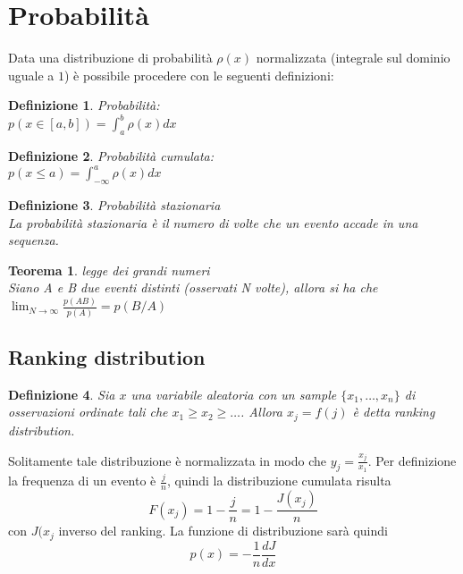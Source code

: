\documentclass[12pt, a4paper]{book}
\theoremstyle{theorem}
\newtheorem{definition}{Definizione}[section]
\newtheorem{theorem}{Teorema}[section]
\begin{document}
		\section{Probabilità}
			Data una distribuzione di probabilità $\rho(x)$ normalizzata (integrale sul dominio uguale a $1$) è possibile procedere con le seguenti definizioni:
			\begin{definition} Probabilità:\\
				$p(x\in[a,b])=\int_{a}^{b}\rho(x)dx$
			\end{definition}
			\begin{definition} Probabilità cumulata:\\
				$p(x\leq a)=\int_{-\infty}^{a}\rho(x)dx$
			\end{definition}
			\begin{definition}
				Probabilità stazionaria\\
				La probabilità stazionaria è il numero di volte che un evento accade in una sequenza.
			\end{definition}
			\begin{theorem}
				legge dei grandi numeri\\
				Siano A e B due eventi distinti (osservati N volte), allora si ha che\\
				$\lim_{N\to\infty}\frac{p(AB)}{p(A)}=p(B/A)$
			\end{theorem}
			\subsection{Ranking distribution}
				\begin{definition}
					Sia $x$ una variabile aleatoria con un sample $\{x_{1},\ldots,x_{n}\}$ di osservazioni ordinate tali che $x_{1}\geq x_{2}\geq\ldots$.
					Allora $x_{j}=f(j)$ è detta ranking distribution.
				\end{definition}
				Solitamente tale distribuzione è normalizzata in modo che $y_{j}=\frac{x_{j}}{x_{1}}$.
				Per definizione la frequenza di un evento è $\frac{j}{n}$, quindi la distribuzione cumulata risulta
				\begin{equation}
					F(x_{j})=1-\frac{j}{n}=1-\frac{J(x_{j})}{n}
				\end{equation}
				con $J(x_{j}$ inverso del ranking.
				La funzione di distribuzione sarà quindi
				\begin{equation}
					p(x)=-\frac{1}{n}\frac{dJ}{dx}
				\end{equation}
		
\end{document}
